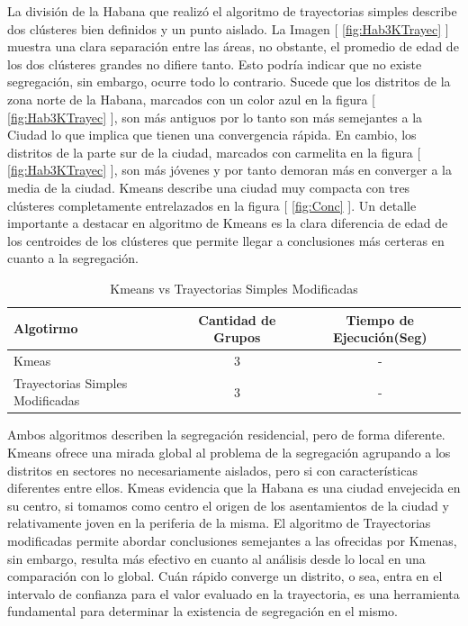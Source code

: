 La división de la Habana que realizó el algoritmo de trayectorias simples describe dos clústeres bien definidos y un punto aislado. La Imagen [ \ref{fig:Hab3KTrayec} ] muestra una clara separación entre las áreas, no obstante, el promedio de edad de los dos clústeres grandes no difiere tanto. Esto podría indicar que no existe segregación, sin embargo, ocurre todo lo contrario. Sucede que los distritos de la zona norte de la Habana, marcados con un color azul en la figura [ \ref{fig:Hab3KTrayec} ], son más antiguos por lo tanto son más semejantes a la Ciudad lo que implica que tienen una convergencia rápida. En cambio, los distritos de la parte sur de la ciudad, marcados con carmelita en la figura [ \ref{fig:Hab3KTrayec} ], son más jóvenes y por tanto demoran más en converger a la media de la ciudad. Kmeans describe una ciudad muy compacta con tres clústeres completamente entrelazados en la figura [ \ref{fig:Conc} ]. Un detalle importante a destacar en algoritmo de Kmeans es la clara diferencia de edad de los centroides de los clústeres que permite llegar a conclusiones más certeras en cuanto a la segregación.

\begin{table}[h!]
	\begin{center}
		\begin{tabular}{| l | c | c |}
			\hline
			Algotirmo & Cantidad de Grupos & Tiempo de Ejecución(Seg) \\ \hline
			Kmeas & 3 & - \\
			Trayectorias Simples Modificadas & 3 & - \\ \hline
			
		\end{tabular}
		\caption{Kmeans vs Trayectorias Simples Modificadas}
		\label{tab:comparacionMetodos}
	\end{center}
\end{table}

Ambos algoritmos describen la segregación residencial, pero de forma diferente. Kmeans ofrece una mirada global al problema de la segregación agrupando a los distritos en sectores no necesariamente aislados, pero si con características diferentes entre ellos. Kmeas evidencia que la Habana es una ciudad envejecida en su centro, si tomamos como centro el origen de los asentamientos de la ciudad y relativamente joven en la periferia de la misma. El algoritmo de Trayectorias modificadas permite abordar conclusiones semejantes a las ofrecidas por Kmenas, sin embargo, resulta más efectivo en cuanto al análisis desde lo local en una comparación con lo global. Cuán rápido converge un distrito, o sea, entra en el intervalo de confianza para el valor evaluado en la trayectoria, es una herramienta fundamental para determinar la existencia de segregación en el mismo.
